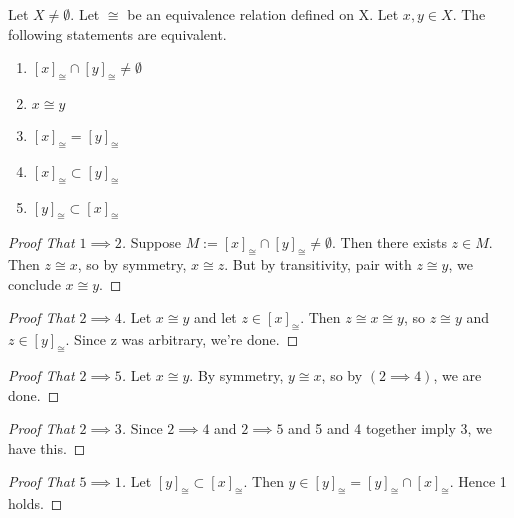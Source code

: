 \begin{prop}
    \label{prop:EquivalenceClassesPartition}
    
    Let $X \neq \emptyset$. 
    Let $\cong$ be an equivalence relation defined on X. 
    Let $x,y \in X$. 
    The following statements are equivalent. 
    \begin{enumerate}
        \item $[x]_{\cong}  \cap [y]_{\cong} \neq \emptyset$
        \item $x \cong y$
        \item $[x]_{\cong} = [y]_{\cong}$
        \item $[x]_{\cong} \subset [y]_{\cong}$
        \item $[y]_{\cong} \subset [x]_{\cong}$ 
    \end{enumerate}
    
\begin{proof}[Proof That $1 \implies 2$]
Suppose $M:=[x]_{\cong} \cap [y]_{\cong} \neq \emptyset$. 
Then there exists $z \in M$.
Then $z \cong x$, so by symmetry, $x \cong z$. 
But by transitivity, pair with $z \cong y$, we conclude $x \cong y$. 
\end{proof}
\begin{proof}[Proof That $2 \implies 4$]
    Let $x \cong y$ and let $z \in [x]_{\cong}$. 
    Then $z \cong x \cong y$, so $z \cong y$ and $z \in [y]_{\cong}$.
    Since z was arbitrary, we're done. 
\end{proof}
\begin{proof}[Proof That $2 \implies 5$]
    Let $x \cong y$. By symmetry, $y \cong x$, so by $(2 \implies 4)$, we are done. 
\end{proof}
\begin{proof}[Proof That $2 \implies 3$]
    Since  $2 \implies 4$ and $2 \implies 5$ and 5 and 4 together imply 3, we have this. 
\end{proof}
\begin{proof}[Proof That $5 \implies 1$]
    Let $[y]_{\cong} \subset [x]_{\cong}$. 
    Then $y \in [y]_{\cong} = [y]_{\cong} \cap [x]_{\cong} $.
    Hence 1 holds. 
\end{proof}

\end{prop} 